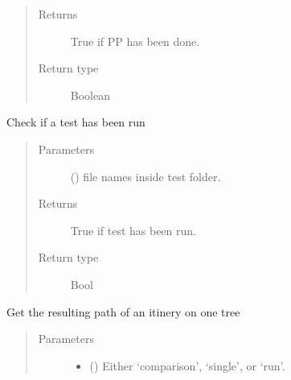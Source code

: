 \documentclass[letterpaper,10pt,english]{sphinxmanual}
\begin{document}
\begin{fulllineitems}
\begin{fulllineitems}
\begin{quote}
\begin{description}
\item[{Returns}] \leavevmode
True if PP has been done.

\item[{Return type}] \leavevmode
Boolean

\end{description}\end{quote}

\end{fulllineitems}


\begin{fulllineitems}
\label{\detokenize{api/initobjects:status.Status.check_test_run}}
Check if a test has been run
\begin{quote}\begin{description}
\item[{Parameters}] \leavevmode
{} () \textendash{} file names inside test folder.

\item[{Returns}] \leavevmode
{} \textendash{} True if test has been run.

\item[{Return type}] \leavevmode
Bool

\end{description}\end{quote}

\end{fulllineitems}


\begin{fulllineitems}
\label{\detokenize{api/initobjects:status.Status.get_path}}
Get the resulting path of an itinery on one tree
\begin{quote}\begin{description}
\item[{Parameters}] \leavevmode\begin{itemize}
\item {} 
 () \textendash{} Either ‘comparison’, ‘single’, or ‘run’.


\end{itemize}
\end{description}
\end{quote}
\end{fulllineitems}
\end{fulllineitems}
\end{document}

